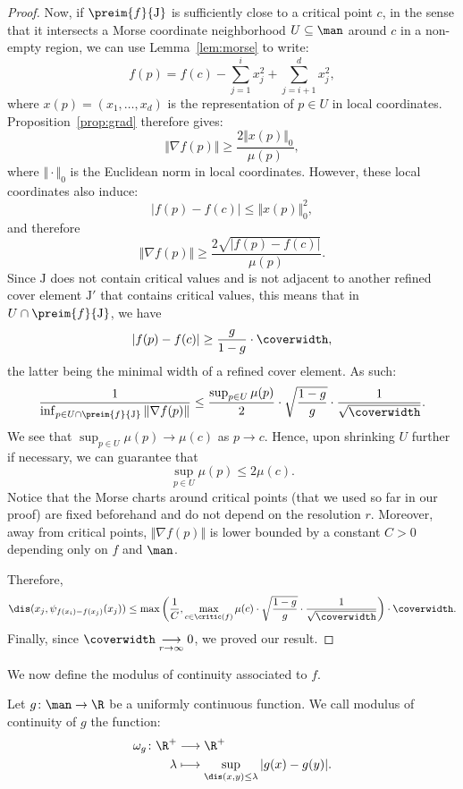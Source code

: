 \begin{proof}
Now, if $\preim{f}{\mathrm{J}}$ is sufficiently close to a critical point $c$, in the sense that it intersects a Morse coordinate neighborhood $U\subseteq\man$ around $c$ in a non-empty region, we can use Lemma~\ref{lem:morse} to write:
 $$f(p)=f(c)-\sum_{j=1}^ix_j^2+\sum_{j=i+1}^dx_j^2,$$
where $x(p)=(x_1,\dots,x_d)$ is the representation of $p\in U$ in local coordinates. Proposition~\ref{prop:grad} therefore gives:
$$\Vert\nabla f(p)\Vert\geq\frac{2\Vert x(p)\Vert_0}{\mu(p)},$$
where $\Vert\cdot\Vert_0$ is the Euclidean norm in local coordinates. 
However, these local coordinates also induce:
$$|f(p)-f(c)|\leq \Vert x(p)\Vert_0^2,$$
and therefore %
$$\Vert\nabla f(p)\Vert\geq\frac{2\sqrt{|f(p)-f(c)|}}{\mu(p)}.$$ 
Since $\mathrm{J}$ does not contain critical values and is not adjacent to another refined cover element $\mathrm{J}'$ that contains critical values, this means that in $U\cap \preim{f}{\mathrm{J}}$, we have 
$$|f(p)-f(c)|\geq \frac{g}{1-g}\cdot\coverwidth,$$
the latter being the minimal width of a refined cover element. 
As such:
$$\frac{1}{\inf_{p\in U\cap \preim{f}{\mathrm{J}}}\Vert\nabla f(p)\Vert}\leq \frac{\sup_{p\in U}\mu(p)}{2}\cdot\sqrt{\frac{1-g}{g}}\cdot\frac{1}{\sqrt{\coverwidth}}.$$
We see that $\sup_{p\in U}\mu(p)\rightarrow\mu(c)$ as $p\rightarrow c$. Hence, upon shrinking $U$ further if necessary, we can guarantee that
$$\sup_{p\in U}\mu(p)\leq 2\mu(c).$$
Notice that the Morse charts around critical points (that we used so far in our proof) are fixed beforehand and do not depend on the resolution $r$. Moreover, away from critical points, $\Vert\nabla f(p)\Vert$ is lower bounded by a constant $C>0$ depending only on $f$ and $\man$. %

Therefore,
%
$$\dis(x_j,\psi_{f(x_i)-f(x_j)}(x_j))\leq \max\left(\frac{1}{C},\max_{c\in\critic(f)}\mu(c)\cdot\sqrt{\frac{1-g}{g}}\cdot\frac{1}{\sqrt{\coverwidth}}\right)\cdot\coverwidth.$$
%
Finally, since $\coverwidth\underset{r\rightarrow\infty}{\longrightarrow}0$, we proved our result.
\end{proof}

We now define the modulus of continuity associated to $f$.
\begin{definition}
Let $g\colon\man\rightarrow\R$ be a uniformly continuous function. We call modulus of continuity of $g$ the function:
 \begin{align*}
     \omega_g\colon\R^+&\longrightarrow\R^+\\
     \lambda&\longmapsto \sup_{\dis(x,y)\leq\lambda}|g(x)-g(y)| .
 \end{align*}
\end{definition}

